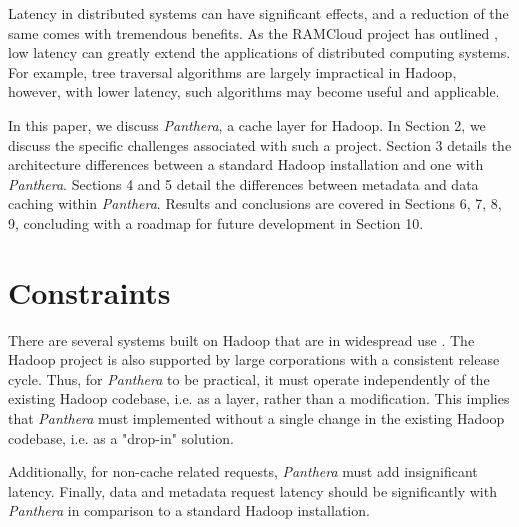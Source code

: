 \documentclass[12pt]{article}
\begin{document}
Latency in distributed systems can have significant effects, and a reduction of the same comes with tremendous benefits. As the RAMCloud project has outlined \cite{ramcloud}, low latency can greatly extend the applications of distributed computing systems. For example, tree traversal algorithms are largely impractical in Hadoop, however, with lower latency, such algorithms may become useful and applicable.

In this paper, we discuss \textit{Panthera}, a cache layer for Hadoop. In Section 2, we discuss the specific challenges associated with such a project. Section 3 details the architecture differences between a standard Hadoop installation and one with \textit{Panthera}.  Sections 4 and 5 detail the differences between metadata and data caching within \textit{Panthera}. Results and conclusions are covered in Sections 6, 7, 8, 9, concluding with a roadmap for future development in Section 10.

\section{Constraints}

There are several systems built on Hadoop that are in widespread use \cite{hbase, cloudbatch, pig}. The Hadoop project is also supported by large corporations with a 
consistent release cycle. Thus, for \textit{Panthera} to be practical, it must operate independently of the existing Hadoop codebase, i.e. as a layer, rather than a modification. This implies that \textit{Panthera} must implemented without a single change in the existing Hadoop codebase, i.e. as a "drop-in" solution.

Additionally, for non-cache related requests, \textit{Panthera} must add insignificant latency. Finally, data and metadata request latency should be significantly with \textit{Panthera} in comparison to a standard Hadoop installation.
\end{document}
